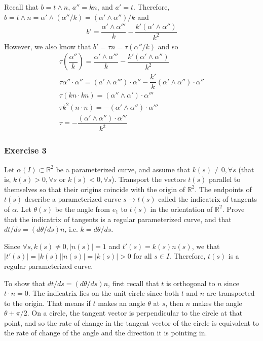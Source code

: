 \documentclass{article}
\newcommand{\R}{\mathbb{R}}
\begin{document}
	Recall that $b = t \wedge n$, $a'' = kn$, and $a' = t$. Therefore, $b = t \wedge n = \alpha' \wedge (\alpha'' / k) = (\alpha' \wedge \alpha'') / k$ and
	\begin{gather*}
		b' = \dfrac{\alpha' \wedge \alpha'''}{k} - \dfrac{k'(\alpha' \wedge \alpha'')}{k^2}
	\end{gather*}
	However, we also know that $b' = \tau n = \tau (\alpha'' / k)$ and so 
	\begin{gather*}
		\tau \left( \dfrac{\alpha''}{k} \right) = \dfrac{\alpha' \wedge \alpha'''}{k} - \dfrac{k'(\alpha' \wedge \alpha'')}{k^2} \\
		\tau \alpha'' \cdot \alpha'' = (a' \wedge \alpha''') \cdot \alpha''  - \dfrac{k'}{k} (\alpha' \wedge \alpha'') \cdot \alpha'' \\
		\tau (kn \cdot kn) = (\alpha'' \wedge \alpha') \cdot \alpha''' \\
		\tau k^2 (n \cdot n) = - (\alpha' \wedge \alpha'') \cdot \alpha''' \\
		\tau = - \dfrac{(\alpha' \wedge \alpha'') \cdot \alpha'''}{k^2}
	\end{gather*}
	
	\subsubsection*{Exercise 3}
	Let $\alpha(I) \subset \R^2$ be a parameterized curve, and assume that $k(s) \neq 0, \forall s$ (that is, $k(s) > 0, \forall s$ or $k(s) < 0, \forall s$). Transport the vectors $t(s)$ parallel to themselves so that their origins coincide with the origin of $\R^2$. The endpoints of $t(s)$ describe a parameterized curve $s \to t(s)$ called the indicatrix of tangents of $\alpha$. Let $\theta(s)$ be the angle from $e_1$ to $t(s)$ in the orientation of $\R^2$. Prove that the indicatrix of tangents is a regular parameterized curve, and that $dt/ds = (d\theta/ds)n$, i.e. $k = d\theta/ds$.
	
	
	Since $\forall s, k(s) \neq 0, |n(s)| = 1$ and $t'(s) = k(s)n(s)$, we that $|t'(s)| = |k(s)||n(s)| = |k(s)| > 0$ for all $s \in I$. Therefore, $t(s)$ is a regular parameterized curve.
	
	To show that $dt/ds = (d\theta/ds)n$, first recall that $t$ is orthogonal to $n$ since $t \cdot n = 0$. The indicatrix lies on the unit circle since both $t$ and $n$ are transported to the origin. That means if $t$ makes an angle $\theta$ at $s$, then $n$ makes the angle $\theta + \pi/2$. On a circle, the tangent vector is perpendicular to the circle at that point, and so the rate of change in the tangent vector of the circle is equivalent to the rate of change of the angle and the direction it is pointing in.
	
\end{document}
